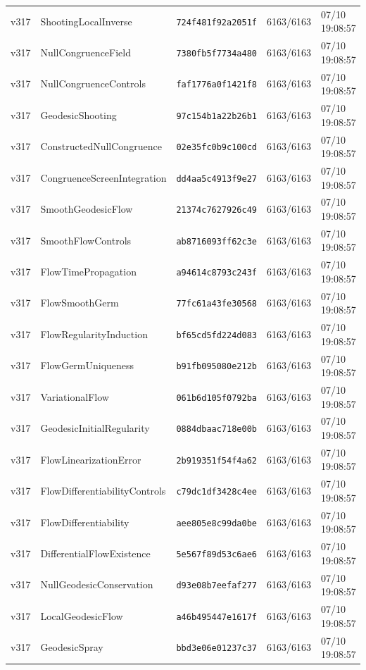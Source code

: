 \documentclass[11pt]{article}
\theoremstyle{definition}\newtheorem{deriv}{Derivation}
\begin{document}
{\begin{longtable}{@{}lllll@{}}
v317 & ShootingLocalInverse & \texttt{724f481f92a2051f} & 6163/6163 & 07/10 19:08:57 \\
v317 & NullCongruenceField & \texttt{7380fb5f7734a480} & 6163/6163 & 07/10 19:08:57 \\
v317 & NullCongruenceControls & \texttt{faf1776a0f1421f8} & 6163/6163 & 07/10 19:08:57 \\
v317 & GeodesicShooting & \texttt{97c154b1a22b26b1} & 6163/6163 & 07/10 19:08:57 \\
v317 & ConstructedNullCongruence & \texttt{02e35fc0b9c100cd} & 6163/6163 & 07/10 19:08:57 \\
v317 & CongruenceScreenIntegration & \texttt{dd4aa5c4913f9e27} & 6163/6163 & 07/10 19:08:57 \\
v317 & SmoothGeodesicFlow & \texttt{21374c7627926c49} & 6163/6163 & 07/10 19:08:57 \\
v317 & SmoothFlowControls & \texttt{ab8716093ff62c3e} & 6163/6163 & 07/10 19:08:57 \\
v317 & FlowTimePropagation & \texttt{a94614c8793c243f} & 6163/6163 & 07/10 19:08:57 \\
v317 & FlowSmoothGerm & \texttt{77fc61a43fe30568} & 6163/6163 & 07/10 19:08:57 \\
v317 & FlowRegularityInduction & \texttt{bf65cd5fd224d083} & 6163/6163 & 07/10 19:08:57 \\
v317 & FlowGermUniqueness & \texttt{b91fb095080e212b} & 6163/6163 & 07/10 19:08:57 \\
v317 & VariationalFlow & \texttt{061b6d105f0792ba} & 6163/6163 & 07/10 19:08:57 \\
v317 & GeodesicInitialRegularity & \texttt{0884dbaac718e00b} & 6163/6163 & 07/10 19:08:57 \\
v317 & FlowLinearizationError & \texttt{2b919351f54f4a62} & 6163/6163 & 07/10 19:08:57 \\
v317 & FlowDifferentiabilityControls & \texttt{c79dc1df3428c4ee} & 6163/6163 & 07/10 19:08:57 \\
v317 & FlowDifferentiability & \texttt{aee805e8c99da0be} & 6163/6163 & 07/10 19:08:57 \\
v317 & DifferentialFlowExistence & \texttt{5e567f89d53c6ae6} & 6163/6163 & 07/10 19:08:57 \\
v317 & NullGeodesicConservation & \texttt{d93e08b7eefaf277} & 6163/6163 & 07/10 19:08:57 \\
v317 & LocalGeodesicFlow & \texttt{a46b495447e1617f} & 6163/6163 & 07/10 19:08:57 \\
v317 & GeodesicSpray & \texttt{bbd3e06e01237c37} & 6163/6163 & 07/10 19:08:57 \\

\end{longtable}}
\end{document}
